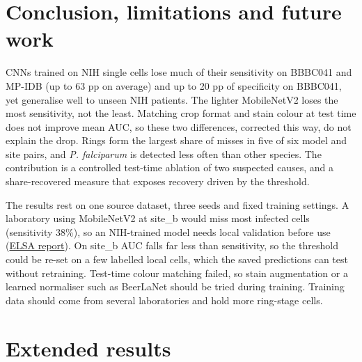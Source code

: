\documentclass[11pt,a4paper]{article}
\begin{document}
\section{Conclusion, limitations and future work}

CNNs trained on NIH single cells lose much of their sensitivity on BBBC041 and MP-IDB (up to 63 pp on average) and up to 20 pp of specificity on BBBC041, yet generalise well to unseen NIH patients. The lighter \mbox{MobileNetV2} loses the most sensitivity, not the least. Matching crop format and stain colour at test time does not improve mean AUC, so these two differences, corrected this way, do not explain the drop. Rings form the largest share of misses in five of six model and site pairs, and \emph{P. falciparum} is detected less often than other species. The contribution is a controlled test-time ablation of two suspected causes, and a share-recovered measure that exposes recovery driven by the threshold.

The results rest on one source dataset, three seeds and fixed training settings. A laboratory using \mbox{MobileNetV2} at site\_b would miss most infected cells (sensitivity 38\%), so an NIH-trained model needs local validation before use (\href{https://gitlab.uvt.nl/capstone/2026-fall/u927271/-/blob/main/docs/elsa_report_v3.md}{ELSA report}). On site\_b AUC falls far less than sensitivity, so the threshold could be re-set on a few labelled local cells, which the saved predictions can test without retraining. Test-time colour matching failed, so stain augmentation or a learned normaliser such as BeerLaNet \citep{xu2025} should be tried during training. Training data should come from several laboratories and hold more ring-stage cells.

\printbibliography[heading=ctbib,title=References]

\appendix
\setcounter{table}{0}

\clearpage
\section{Extended results}
\end{document}
